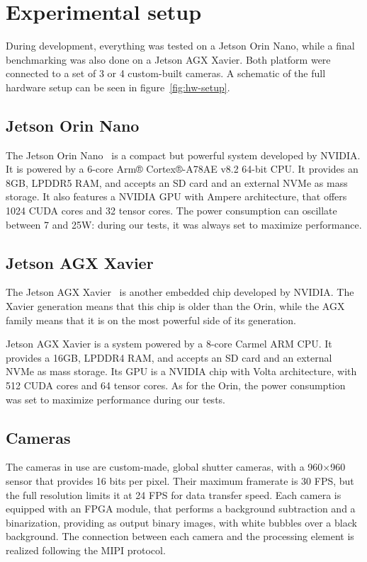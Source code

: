 \chapter{Experimental setup}
\label{chap:experim-setup}

During development, everything was tested on a Jetson Orin Nano, while a final benchmarking was also done on a Jetson AGX Xavier.
Both platform were connected to a set of 3 or 4 custom-built cameras.
A schematic of the full hardware setup can be seen in figure~\ref{fig:hw-setup}.

\section{Jetson Orin Nano}

The Jetson Orin Nano~\cite{jetson} is a compact but powerful system developed by NVIDIA.
It is powered by a 6-core Arm® Cortex®-A78AE v8.2 64-bit CPU.
It provides an 8GB, LPDDR5 RAM, and accepts an SD card and an external NVMe as mass storage.
It also features a NVIDIA GPU with Ampere architecture, that offers 1024 CUDA cores and 32 tensor cores.
The power consumption can oscillate between 7 and 25W: during our tests, it was always set to maximize performance.

\section{Jetson AGX Xavier}

The Jetson AGX Xavier~\cite{xavier} is another embedded chip developed by NVIDIA.
The Xavier generation means that this chip is older than the Orin, while the AGX family means that it is on the most powerful side of its generation.

Jetson AGX Xavier is a system powered by a 8-core Carmel ARM CPU.
It provides a 16GB, LPDDR4 RAM, and accepts an SD card and an external NVMe as mass storage.
Its GPU is a NVIDIA chip with Volta architecture, with 512 CUDA cores and 64 tensor cores.
As for the Orin, the power consumption was set to maximize performance during our tests.

\section{Cameras}

The cameras in use are custom-made, global shutter cameras, with a 960{$\times$}960 sensor that provides 16 bits per pixel.
Their maximum framerate is 30 FPS, but the full resolution limits it at 24 FPS for data transfer speed.
Each camera is equipped with an FPGA module, that performs a background subtraction and a binarization, providing as output binary images, with white bubbles over a black background.
The connection between each camera and the processing element is realized following the MIPI protocol.

